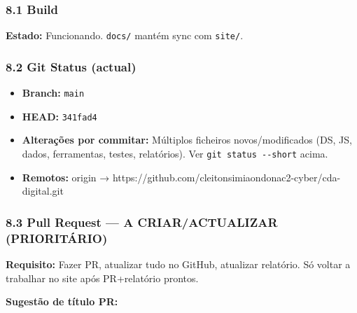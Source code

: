 \subsubsection{8.1 Build}\label{build}

\begin{Shaded}
\begin{Highlighting}[]
\end{Highlighting}
\end{Shaded}

\textbf{Estado:} Funcionando. \texttt{docs/} mantém sync com
\texttt{site/}.

\subsubsection{8.2 Git Status (actual)}\label{git-status-actual}

\begin{itemize}
\tightlist
\item
  \textbf{Branch:} \texttt{main}
\item
  \textbf{HEAD:} \texttt{341fad4}
\item
  \textbf{Alterações por commitar:} Múltiplos ficheiros
  novos/modificados (DS, JS, dados, ferramentas, testes, relatórios).
  Ver \texttt{git\ status\ -\/-short} acima.
\item
  \textbf{Remotos:} origin →
  https://github.com/cleitonsimiaondonac2-cyber/cda-digital.git
\end{itemize}

\subsubsection{8.3 Pull Request --- A CRIAR/ACTUALIZAR
(PRIORITÁRIO)}\label{pull-request-a-criaractualizar-priorituxe1rio}

\textbf{Requisito:} Fazer PR, atualizar tudo no GitHub, atualizar
relatório. Só voltar a trabalhar no site após PR+relatório prontos.

\textbf{Sugestão de título PR:}

\begin{Shaded}
\begin{Highlighting}[]
\end{Highlighting}
\end{Shaded}

